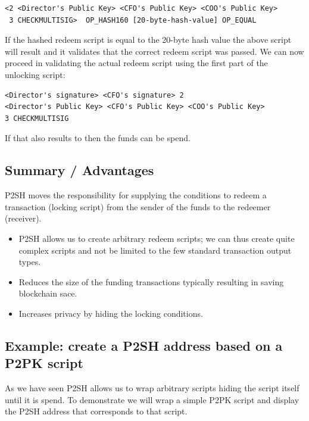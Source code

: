 \begin{emphbox}
\begin{lstlisting}[style=Pseudomath]
<2 <Director's Public Key> <CFO's Public Key> <COO's Public Key>
 3 CHECKMULTISIG>  OP_HASH160 [20-byte-hash-value] OP_EQUAL
\end{lstlisting}
\end{emphbox}

If the hashed redeem script is equal to the 20-byte hash value the above script will result  and it validates that the correct redeem script was passed. We can now proceed in validating the actual redeem script using the first part of the unlocking script:

\begin{emphbox}
\begin{lstlisting}[style=Pseudomath]
<Director's signature> <CFO's signature> 2
<Director's Public Key> <CFO's Public Key> <COO's Public Key>
3 CHECKMULTISIG
\end{lstlisting}
\end{emphbox}

If that also results to  then the funds can be spend.

\subsection*{Summary / Advantages}
P2SH moves the responsibility for supplying the conditions to redeem a transaction (locking script) from the sender of the funds to the redeemer (receiver).

\begin{itemize}
\item P2SH allows us to create arbitrary redeem scripts; we can thus create quite complex scripts and not be limited to the few standard transaction output types.
\item Reduces the size of the funding transactions typically resulting in saving blockchain sace.
\item Increases privacy by hiding the locking conditions.
\end{itemize}

\subsection*{Example: create a P2SH address based on a P2PK script}
As we have seen P2SH allows us to wrap arbitrary scripts hiding the script itself until it is spend. To demonstrate we will wrap a simple P2PK script and display the P2SH address that corresponds to that script.

